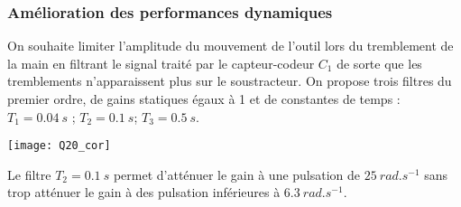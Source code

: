 \begin{multicols}{2}
\subsubsection*{Amélioration des performances dynamiques}
\ifprof
\else
On souhaite limiter l’amplitude du mouvement de l’outil lors du tremblement de la main en  filtrant le signal traité par le capteur-codeur $C_1$ de sorte que les tremblements n’apparaissent plus sur le soustracteur. On propose trois filtres du premier ordre, de gains statiques égaux à 1 et de constantes de temps :	 $T_1 = \SI{0,04}{s}$ ; $T_2 = \SI{0,1}{s}$; $T_3 = \SI{0,5}{s}$.
\fi


\ifprof
\begin{center}
\texttt{[image: Q20\_cor]}
\end{center}
\begin{corrige}
Le filtre $T_2 = \SI{0,1}{s}$ permet d'atténuer le gain à une pulsation de $\SI{25}{rad.s^{-1}}$ sans trop atténuer le gain à des pulsation inférieures à $\SI{6,3}{rad.s^{-1}}$.
\end{corrige}
\else
\fi
%
%
%
\ifprof
\else
\end{multicols}
\fi


